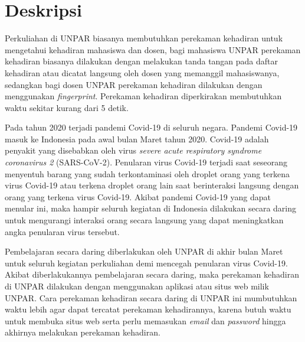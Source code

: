 \documentclass[a4paper,twoside]{article}
\begin{document}
\title{\@judultopik}
\author{\nama \textendash \@npm} 

\newcommand{\nama}{Reinalta Sugianto}
\newcommand{\@npm}{2017730035}
\newcommand{\@judultopik}{Perekaman Kehadiran Daring Otomatis} %
\newcommand{\jumpemb}{1} %
\newcommand{\tanggal}{04/10/2021}


\maketitle


\section{Deskripsi}
Perkuliahan di UNPAR biasanya membutuhkan perekaman kehadiran untuk mengetahui kehadiran mahasiswa dan dosen, bagi mahasiswa UNPAR perekaman kehadiran biasanya dilakukan dengan melakukan tanda tangan pada daftar kehadiran atau dicatat langsung oleh dosen yang memanggil mahasiswanya, sedangkan bagi dosen UNPAR perekaman kehadiran dilakukan dengan menggunakan  \textit{fingerprint}. Perekaman kehadiran diperkirakan membutuhkan waktu sekitar kurang dari 5 detik.

Pada tahun 2020 terjadi pandemi Covid-19 di seluruh negara. Pandemi Covid-19 masuk ke Indonesia pada awal bulan Maret tahun 2020. Covid-19 adalah penyakit yang disebabkan oleh virus \textit{severe acute respiratory syndrome coronavirus 2} (SARS-CoV-2). Penularan virus Covid-19 terjadi saat seseorang menyentuh barang yang sudah terkontaminasi oleh droplet orang yang terkena virus Covid-19 atau terkena droplet orang lain saat berinteraksi langsung dengan orang yang terkena virus Covid-19.  Akibat pandemi Covid-19 yang dapat menular ini, maka hampir seluruh kegiatan di Indonesia dilakukan secara daring untuk mengurangi interaksi orang secara langsung yang dapat meningkatkan angka penularan virus tersebut. 

Pembelajaran secara daring diberlakukan oleh UNPAR di akhir bulan Maret untuk seluruh kegiatan perkuliahan demi mencegah penularan virus Covid-19. Akibat diberlakukannya pembelajaran secara daring, maka perekaman kehadiran di UNPAR dilakukan dengan menggunakan aplikasi atau situs web milik UNPAR. Cara perekaman kehadiran secara daring di UNPAR ini mumbutuhkan waktu lebih agar dapat tercatat perekaman kehadirannya, karena butuh waktu untuk membuka situs web serta perlu memasukan \textit{email} dan \textit{password} hingga akhirnya melakukan perekaman kehadiran. 
\end{document}

